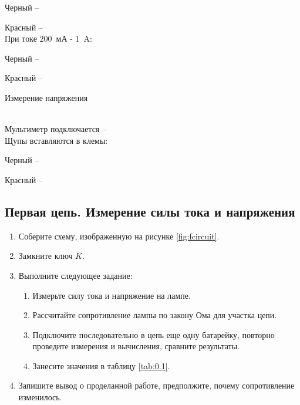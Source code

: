 Черный -- \hrulefill

Красный -- \hrulefill
\\
При токе $200$~мА - $1$~A:

Черный -- \hrulefill

Красный -- \hrulefill

Измерение напряжения

\\
Мультиметр подключается -- \hrulefill
\\
Щупы вставляются в клемы:

Черный -- \hrulefill

Красный -- \hrulefill




\subsection{Первая цепь. Измерение силы тока и напряжения}
%
%
\begin{enumerate}
    \item Соберите схему, изображенную на рисунке \ref{fig:fcircuit}.
    \item Замкните ключ $K$.
	\item Выполните следующее задание:
\begin{enumerate}
    \item Измерьте силу тока и напряжение на лампе.
    \item Рассчитайте сопротивление лампы по закону Ома для участка цепи.
	\item Подключите последовательно в цепь еще одну батарейку, повторно проведите измерения и вычисления, сравните результаты.
	\item Занесите значения в таблицу \ref{tab:0.1}.
	\end{enumerate}
    	 \item Запишите вывод о проделанной работе, предполжите, почему сопротивление изменилось.
\end{enumerate}


